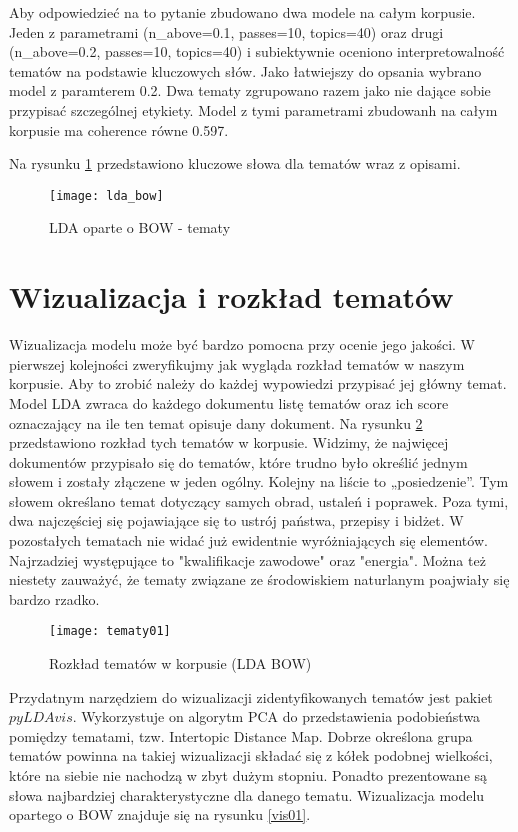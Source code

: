 \documentclass[a4paper,11pt,twoside]{report}
\theoremstyle{definition}
\begin{document}
Aby odpowiedzieć na to pytanie zbudowano dwa modele na całym korpusie. Jeden z parametrami (n\_above=0.1, passes=10, topics=40) oraz drugi (n\_above=0.2, passes=10, topics=40) i subiektywnie oceniono interpretowalność tematów na podstawie kluczowych słów. Jako łatwiejszy do opsania wybrano model z paramterem 0.2. Dwa tematy zgrupowano razem jako nie dające sobie przypisać szczególnej etykiety. Model z tymi parametrami zbudowanh na całym korpusie ma coherence równe 0.597.

Na rysunku \ref{pic:lda1} przedstawiono kluczowe słowa dla tematów wraz z opisami.


\begin{figure}
\texttt{[image: lda\_bow]} 
\centering \caption{LDA oparte o BOW - tematy}
\label{pic:lda1}
\end{figure}



\section{Wizualizacja i rozkład tematów}\label{section:ldavis}

Wizualizacja modelu może być bardzo pomocna przy ocenie jego jakości. W pierwszej kolejności zweryfikujmy jak wygląda rozkład tematów w naszym korpusie. Aby to zrobić należy do każdej wypowiedzi przypisać jej główny temat. Model LDA zwraca do każdego dokumentu listę tematów oraz ich score oznaczający na ile ten temat opisuje dany dokument. Na rysunku \ref{top_dist01} przedstawiono rozkład tych tematów w korpusie. Widzimy, że najwięcej dokumentów przypisało się do tematów, które trudno było określić jednym słowem i zostały złączene w jeden ogólny. Kolejny na liście to „posiedzenie”. Tym słowem określano temat dotyczący samych obrad, ustaleń i poprawek. Poza tymi, dwa najczęściej się pojawiające się to ustrój państwa, przepisy i bidżet. W pozostałych tematach nie widać już ewidentnie wyróżniających się elementów. Najrzadziej występujące to "kwalifikacje zawodowe" oraz "energia". Można też niestety zauważyć, że tematy związane ze środowiskiem naturlanym poajwiały się bardzo rzadko.
\begin{figure}
\texttt{[image: tematy01]} 
\centering \caption{Rozkład tematów w korpusie (LDA BOW)}
 \label{top_dist01}
\end{figure}

Przydatnym narzędziem do wizualizacji zidentyfikowanych tematów jest pakiet $pyLDAvis$. Wykorzystuje on algorytm PCA do przedstawienia podobieństwa pomiędzy tematami, tzw. Intertopic Distance Map. Dobrze określona grupa tematów powinna na takiej wizualizacji składać się z kółek podobnej wielkości, które na siebie nie nachodzą w zbyt dużym stopniu. Ponadto prezentowane są słowa najbardziej charakterystyczne dla danego tematu. Wizualizacja modelu opartego o BOW znajduje się na rysunku \ref{vis01}.
\end{document}
